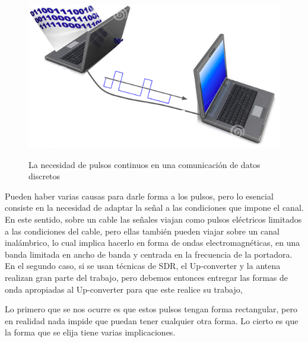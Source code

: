 \begin{figure}[h!]
	\captionsetup{justification = raggedright, singlelinecheck = false}
	\caption{La necesidad de pulsos continuos en una comunicación de datos discretos} 
	\centering
	\includegraphics[scale=0.7]{Imagenes/Computador.png}
	\label{fig:Computador}
\end{figure}

Pueden haber varias causas para darle forma a los pulsos, pero lo esencial consiste en la  necesidad de adaptar la señal a las condiciones que impone el canal. En este sentido, sobre un cable las señales viajan como pulsos eléctricos limitados a las condiciones del cable, pero ellas también pueden viajar sobre un canal inalámbrico, lo cual implica hacerlo en forma de ondas electromagnéticas, en una banda limitada en ancho de banda y centrada en la frecuencia de la portadora. En el segundo caso, si se usan técnicas de SDR, el Up-converter y la antena realizan gran parte del trabajo, pero debemos entonces entregar las formas de onda apropiadas al Up-converter para que este realice su trabajo,

Lo primero que se nos ocurre es que estos pulsos tengan forma rectangular, pero en realidad nada impide que puedan tener cualquier otra forma. Lo cierto es que la forma que se elija tiene varias implicaciones.\\


